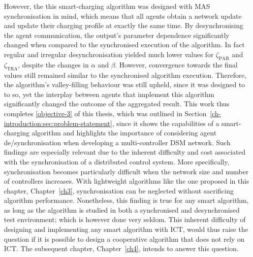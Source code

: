However, the this smart-charging algorithm was designed with MAS synchronisation in mind, which means that all agents obtain a network update and update their charging profile at exactly the same time.
By desynchronising the agent communication, the output's parameter dependence significantly changed when compared to the synchronised execution of the algorithm.
In fact regular and irregular desynchronisation yielded much lower values for $\zeta_\text{PAR}$ and $\zeta_\text{TRA}$, despite the changes in $\alpha$ and $\beta$.
However, convergence towards the final values still remained similar to the synchronised algorithm execution.
Therefore, the algorithm's valley-filling behaviour was still upheld, since it was designed to to so, yet the interplay between agents that implement this algorithm significantly changed the outcome of the aggregated result.
This work thus completes \ref{objective-3} of this thesis, which was outlined in Section~\ref{ch-introduction:sec:problem-statement}, since it shows the capabilities of a smart-charging algorithm and highlights the importance of considering agent de/synchronisation when developing a multi-controller DSM network.
Such findings are especially relevant due to the inherent difficulty and cost associated with the synchronisation of a distributed control system.
More specifically, synchronisation becomes particularly difficult when the network size and number of controllers increases.
With lightweight algorithms like the one proposed in this chapter, Chapter~\ref{ch3}, synchronisation can be neglected without sacrificing algorithm performance.
Nonetheless, this finding is true for any smart algorithm, as long as the algorithm is studied in both a synchronised and desynchronised test environment; which is however done very seldom.
This inherent difficulty of designing and implementing any smart algorithm with ICT, would thus raise the question if it is possible to design a cooperative algorithm that does not rely on ICT.
The subsequent chapter, Chapter~\ref{ch4}, intends to answer this question.






